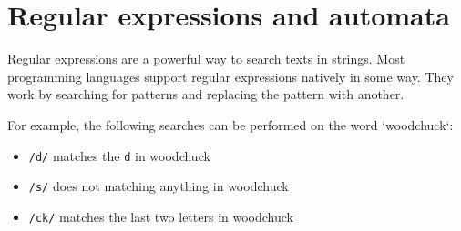 \documentclass[Report.tex]{subfiles}
\begin{document}
\section{Regular expressions and automata}
Regular expressions are a powerful way to search texts in strings. Most
programming languages support regular expressions natively in some way.
They work by searching for patterns and replacing the pattern with another.

For example, the following searches can be performed on the word `woodchuck`:
\begin{itemize}
\item \texttt{/d/} matches the \texttt{d} in woodchuck
\item \texttt{/s/} does not matching anything in woodchuck
\item \texttt{/ck/} matches the last two letters in woodchuck
\end{itemize}
\end{document}
